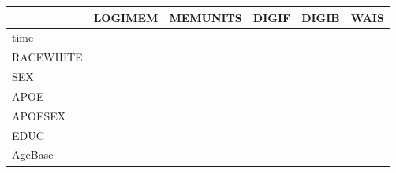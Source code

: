 \documentclass[
]{article}
\begin{document}
\begin{longtable}[t]{l|l|l|l|l|l}
\hline
  & LOGIMEM & MEMUNITS & DIGIF & DIGIB & WAIS\\
\hline
time & \cellcolor{green}{0.09 (0.04, 0.14)} & \cellcolor{green}{0.14 (0.09, 0.19)} & \cellcolor{white}{-0.02 (-0.07, 0.02)} & \cellcolor{red}{-0.06 (-0.11, -0.02)} & \cellcolor{red}{-0.08 (-0.11, -0.05)}\\
\hline
RACEWHITE & \cellcolor{green}{0.13 (0.09, 0.18)} & \cellcolor{green}{0.13 (0.09, 0.17)} & \cellcolor{white}{0.00 (-0.04, 0.04)} & \cellcolor{green}{0.06 (0.02, 0.10)} & \cellcolor{white}{0.01 (-0.01, 0.04)}\\
\hline
SEX & \cellcolor{green}{0.05 (0.01, 0.09)} & \cellcolor{white}{0.03 (-0.01, 0.07)} & \cellcolor{red}{-0.04 (-0.08, -0.01)} & \cellcolor{white}{-0.00 (-0.04, 0.03)} & \cellcolor{white}{0.01 (-0.01, 0.04)}\\
\hline
APOE & \cellcolor{white}{-0.01 (-0.07, 0.05)} & \cellcolor{white}{-0.04 (-0.10, 0.02)} & \cellcolor{white}{0.00 (-0.06, 0.06)} & \cellcolor{white}{0.00 (-0.06, 0.06)} & \cellcolor{white}{-0.00 (-0.05, 0.03)}\\
\hline
APOESEX & \cellcolor{white}{-0.06 (-0.13, 0.02)} & \cellcolor{white}{-0.00 (-0.07, 0.07)} & \cellcolor{white}{-0.01 (-0.08, 0.06)} & \cellcolor{white}{0.02 (-0.05, 0.08)} & \cellcolor{white}{-0.02 (-0.06, 0.03)}\\
\hline
EDUC & \cellcolor{green}{0.00 (0.00, 0.01)} & \cellcolor{green}{0.00 (0.00, 0.01)} & \cellcolor{white}{0.00 (-0.00, 0.00)} & \cellcolor{green}{0.00 (0.00, 0.01)} & \cellcolor{white}{0.00 (0.00, 0.00)}\\
\hline
AgeBase & \cellcolor{red}{-0.01 (-0.01, -0.01)} & \cellcolor{red}{-0.01 (-0.01, -0.01)} & \cellcolor{red}{-0.01 (-0.01, -0.00)} & \cellcolor{red}{-0.01 (-0.01, -0.01)} & \cellcolor{red}{-0.01 (-0.01, -0.01)}\\
\hline
\end{longtable}
\endgroup{}

\begingroup\fontsize{7}{9}\selectfont
\end{document}
